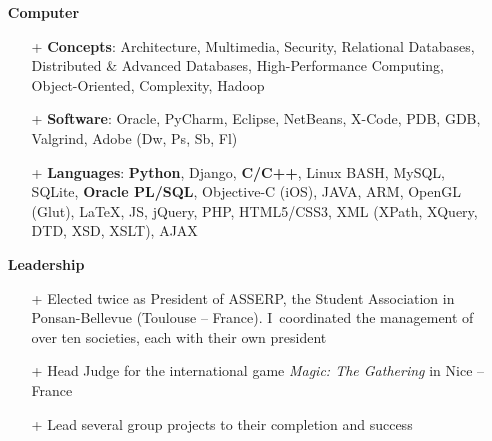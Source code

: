 \documentclass{res}
\begin{document}
\begin{resume}
        \begin{itemize}
        \item[] \textbf{Computer}
                \begin{itemize}
                  \item[+] \textbf{Concepts}: Architecture, Multimedia, Security, Relational Databases, Distributed \& Advanced Databases, High-Performance Computing, Object-Oriented, Complexity, Hadoop
                  \item[+] \textbf{Software}: Oracle, PyCharm, Eclipse, NetBeans, X-Code, PDB, GDB, Valgrind, Adobe (Dw, Ps, Sb, Fl)
                  \item[+] \textbf{Languages}: \textbf{Python}, Django, \textbf{C/C++}, Linux BASH, MySQL, SQLite, \textbf{Oracle PL/SQL}, Objective-C (iOS), JAVA, ARM, OpenGL (Glut), \LaTeX{}, JS, jQuery, PHP, HTML5/CSS3, XML (XPath, XQuery, DTD, XSD, XSLT), AJAX
                \end{itemize}
        \end{itemize}

        \begin{itemize}
        \item[] \textbf{Leadership}
                \begin{itemize}
                   \item[+] Elected twice as President of ASSERP, the Student Association in Ponsan-Bellevue (Toulouse -- France). I~coordinated the management of over ten societies, each with their own president
                  \item[+] Head Judge for the international game \textit{Magic: The Gathering} in Nice -- France
                  \item[+] Lead several group projects to their completion and success
                \end{itemize}   
        \end{itemize}
        

\end{resume}
\end{document}
